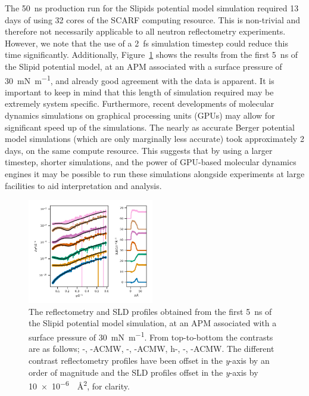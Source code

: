 \documentclass[amsmath,amssymb,twocolumn,superscriptaddress]{revtex4-1}
\begin{document}
The \SI{50}{\nano\second} production run for the Slipids potential model simulation required 13 days of using 32 cores of the SCARF computing resource.
This is non-trivial and therefore not necessarily applicable to all neutron reflectometry experiments.
However, we note that the use of a \SI{2}{\femto\second} simulation timestep could reduce this time significantly.
Additionally, Figure~\ref{fig:5ns} shows the results from the first \SI{5}{\nano\second} of the Slipid potential model, at an APM associated with a surface pressure of \SI{30}{\milli\newton\per\meter}, and already good agreement with the data is apparent.
It is important to keep in mind that this length of simulation required may be extremely system specific.
Furthermore, recent developments of molecular dynamics simulations on graphical processing units (GPUs) may allow for significant speed up of the simulations.
The nearly as accurate Berger potential model simulations (which are only marginally less accurate) took approximately 2 days, on the same compute resource.
This suggests that by using a larger timestep, shorter simulations, and the power of GPU-based molecular dynamics engines it may be possible to run these simulations alongside experiments at large facilities to aid interpretation and analysis.
%
\begin{figure}
 \centering
 \includegraphics[width=0.49\textwidth]{dspc_slipids_30_ref_sld_short}
 \caption{The reflectometry and SLD profiles obtained from the first \SI{5}{\nano\second} of the Slipid potential model simulation, at an APM associated with a surface pressure of \SI{30}{\milli\newton\per\meter}. From top-to-bottom the contrasts are as follows; -, -ACMW, -, -ACMW, h-, -, -ACMW. The different contrast reflectometry profiles have been offset in the \emph{y}-axis by an order of magnitude and the SLD profiles offset in the \emph{y}-axis by \SI{10e-6}{\per\square\angstrom}, for clarity.}
 \label{fig:5ns}
\end{figure}
%
\end{document}
